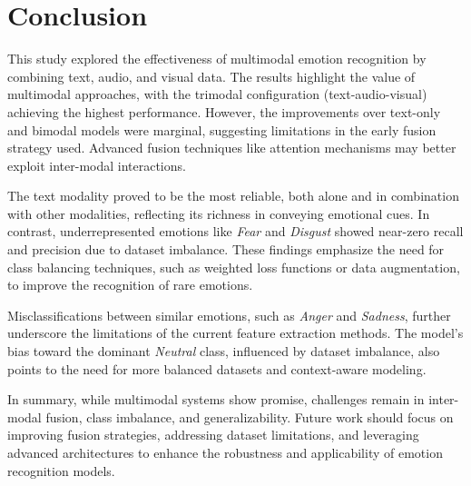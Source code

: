 \section{Conclusion}
This study explored the effectiveness of multimodal emotion recognition by combining text, audio, and visual data. The results highlight the value of multimodal approaches, with the trimodal configuration (text-audio-visual) achieving the highest performance. However, the improvements over text-only and bimodal models were marginal, suggesting limitations in the early fusion strategy used. Advanced fusion techniques like attention mechanisms may better exploit inter-modal interactions.

The text modality proved to be the most reliable, both alone and in combination with other modalities, reflecting its richness in conveying emotional cues. In contrast, underrepresented emotions like \textit{Fear} and \textit{Disgust} showed near-zero recall and precision due to dataset imbalance. These findings emphasize the need for class balancing techniques, such as weighted loss functions or data augmentation, to improve the recognition of rare emotions.

Misclassifications between similar emotions, such as \textit{Anger} and \textit{Sadness}, further underscore the limitations of the current feature extraction methods. The model's bias toward the dominant \textit{Neutral} class, influenced by dataset imbalance, also points to the need for more balanced datasets and context-aware modeling.

In summary, while multimodal systems show promise, challenges remain in inter-modal fusion, class imbalance, and generalizability. Future work should focus on improving fusion strategies, addressing dataset limitations, and leveraging advanced architectures to enhance the robustness and applicability of emotion recognition models.
